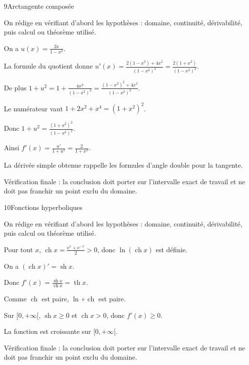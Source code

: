 \documentclass[11pt,a4paper]{article}
\newcommand{\e}{\mathrm{e}}
\newcommand{\ch}{\operatorname{ch}}
\newcommand{\sh}{\operatorname{sh}}
\newcommand{\thh}{\operatorname{th}}
\begin{document}
\begin{corrbox}{9}{Arctangente composée}

\begin{methodebox}
On rédige en vérifiant d'abord les hypothèses : domaine, continuité, dérivabilité, puis calcul ou théorème utilisé.
\end{methodebox}

On a $u(x)=\frac{2x}{1-x^2}$.


La formule du quotient donne $u'(x)=\frac{2(1-x^2)+4x^2}{(1-x^2)^2}=\frac{2(1+x^2)}{(1-x^2)^2}$.


De plus $1+u^2=1+\frac{4x^2}{(1-x^2)^2}=\frac{(1-x^2)^2+4x^2}{(1-x^2)^2}$.


Le numérateur vaut $1+2x^2+x^4=(1+x^2)^2$.


Donc $1+u^2=\frac{(1+x^2)^2}{(1-x^2)^2}$.


Ainsi $f'(x)=\frac{u'}{1+u^2}=\frac{2}{1+x^2}$.


La dérivée simple obtenue rappelle les formules d'angle double pour la tangente.


\begin{attentionbox}
Vérification finale : la conclusion doit porter sur l'intervalle exact de travail et ne doit pas franchir un point exclu du domaine.
\end{attentionbox}

\end{corrbox}


\begin{corrbox}{10}{Fonctions hyperboliques}

\begin{methodebox}
On rédige en vérifiant d'abord les hypothèses : domaine, continuité, dérivabilité, puis calcul ou théorème utilisé.
\end{methodebox}

Pour tout $x$, $\ch x=\frac{\e^x+\e^{-x}}2>0$, donc $\ln(\ch x)$ est définie.


On a $(\ch x)'=\sh x$.


Donc $f'(x)=\frac{\sh x}{\ch x}=\thh x$.


Comme $\ch$ est paire, $\ln\circ\ch$ est paire.


Sur $[0,+\infty[$, $\sh x\ge0$ et $\ch x>0$, donc $f'(x)\ge0$.


La fonction est croissante sur $[0,+\infty[$.


\begin{attentionbox}
Vérification finale : la conclusion doit porter sur l'intervalle exact de travail et ne doit pas franchir un point exclu du domaine.
\end{attentionbox}

\end{corrbox}
\end{document}
